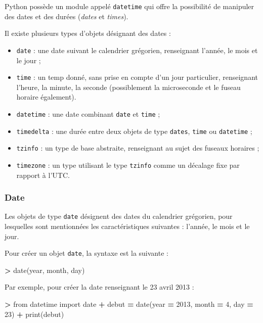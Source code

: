 \documentclass[12pt,]{book}
\newenvironment{Shaded}{\begin{snugshade}}{\end{snugshade}}
\newcommand{\DecValTok}[1]{\textcolor[rgb]{0.00,0.00,0.81}{#1}}
\newcommand{\ImportTok}[1]{#1}
\newcommand{\OperatorTok}[1]{\textcolor[rgb]{0.81,0.36,0.00}{\textbf{#1}}}
\newcommand{\BuiltInTok}[1]{#1}
\newcommand{\NormalTok}[1]{#1}
\providecommand{\tightlist}{%
  \setlength{\itemsep}{0pt}\setlength{\parskip}{0pt}}
\numberwithin{equation}{section}
\numberwithin{countremarque}{section}
\begin{document}
Python possède un module appelé \texttt{datetime} qui offre la
possibilité de manipuler des dates et des durées (\emph{dates} et
\emph{times}).

Il existe plusieurs types d'objets désignant des dates :

\begin{itemize}
\tightlist
\item
  \texttt{date} : une date suivant le calendrier grégorien, renseignant
  l'année, le mois et le jour ;
\item
  \texttt{time} : un temp donné, sans prise en compte d'un jour
  particulier, renseignant l'heure, la minute, la seconde (possiblement
  la microseconde et le fuseau horaire également).
\item
  \texttt{datetime} : une date combinant \texttt{date} et \texttt{time}
  ;
\item
  \texttt{timedelta} : une durée entre deux objets de type
  \texttt{dates}, \texttt{time} ou \texttt{datetime} ;
\item
  \texttt{tzinfo} : un type de base abstraite, renseignant au sujet des
  fuseaux horaires ;
\item
  \texttt{timezone} : un type utilisant le type \texttt{tzinfo} comme un
  décalage fixe par rapport à l'UTC.
\end{itemize}

\subsubsection{Date}\label{type-date}

Les objets de type \texttt{date} désignent des dates du calendrier
grégorien, pour lesquelles sont mentionnées les caractéristiques
suivantes : l'année, le mois et le jour.

Pour créer un objet \texttt{date}, la syntaxe est la suivante :

\begin{Shaded}
\begin{Highlighting}[]
\OperatorTok{>}\NormalTok{ date(year, month, day)}
\end{Highlighting}
\end{Shaded}

Par exemple, pour créer la date renseignant le 23 avril 2013 :

\begin{Shaded}
\begin{Highlighting}[]
\OperatorTok{>} \ImportTok{from}\NormalTok{ datetime }\ImportTok{import}\NormalTok{ date}
\OperatorTok{+}\NormalTok{ debut }\OperatorTok{=}\NormalTok{ date(year }\OperatorTok{=} \DecValTok{2013}\NormalTok{, month }\OperatorTok{=} \DecValTok{4}\NormalTok{, day }\OperatorTok{=} \DecValTok{23}\NormalTok{)}
\OperatorTok{+} \BuiltInTok{print}\NormalTok{(debut)}
\end{Highlighting}
\end{Shaded}
\end{document}
